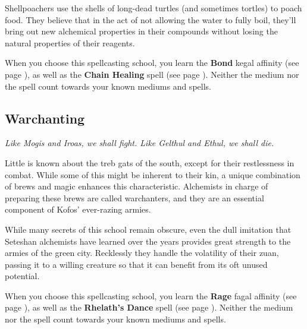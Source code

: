     Shellpoachers use the shells of long-dead turtles (and sometimes tortles) to poach food.
    They believe that in the act of not allowing the water to fully boil, they'll bring out new alchemical properties in their compounds without losing the natural properties of their reagents.

    When you choose this spellcasting school, you learn the \textbf{Bond} kegal affinity (see page \pageref{medium::bond}), as well as the \textbf{Chain Healing} spell (see page \pageref{spell::chainhealing}).
    Neither the medium nor the spell count towards your known mediums and spells.

\subsection*{Warchanting} \label{ssec::warchanting}
    \textit{Like Mogis and Iroas, we shall fight.
    Like Gelthul and Ethul, we shall die.}

    Little is known about the treb gats of the south, except for their restlessness in combat.
    While some of this might be inherent to their kin, a unique combination of brews and magic enhances this characteristic.
    Alchemists in charge of preparing these brews are called warchanters, and they are an essential component of Kofos' ever-razing armies.

    While many secrets of this school remain obscure, even the dull imitation that Seteshan alchemists have learned over the years provides great strength to the armies of the green city.
    Recklessly they handle the volatility of their zuan, passing it to a willing creature so that it can benefit from its oft unused potential.

    When you choose this spellcasting school, you learn the \textbf{Rage} fagal affinity (see page \pageref{medium::rage}), as well as the \textbf{Rhelath's Dance} spell (see page \pageref{spell::rhelathsdance}).
    Neither the medium nor the spell count towards your known mediums and spells.



